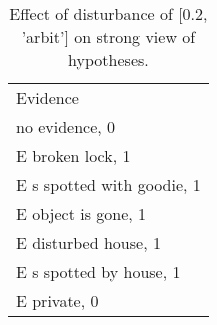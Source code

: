 \begin{table}\begin{tabular}{l}\toprule\multirow{2}{*}{Evidence} \\\\\midrule
no evidence, 0 & \\E broken lock, 1 & \\E s spotted with goodie, 1 & \\E object is gone, 1 & \\E disturbed house, 1 & \\E s spotted by house, 1 & \\E private, 0 & \\\bottomrule\end{tabular}\caption{Effect of disturbance of [0.2, 'arbit'] on strong view of hypotheses.}\end{table}